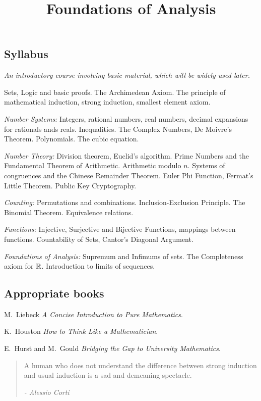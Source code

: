 \documentclass[10pt]{scrartcl}
\title{Foundations of Analysis}
\begin{document}
{
\subsection*{Syllabus}
\textit{An introductory course involving basic material, which will be widely used later.}

Sets, Logic and basic proofs. The Archimedean Axiom. The principle of mathematical induction, strong induction, smallest element axiom. 

\emph{Number Systems:} Integers, rational numbers, real numbers, decimal expansions for rationals ands
reals. Inequalities. The Complex Numbers, De Moivre's Theorem. Polynomials. The cubic equation.

\emph{Number Theory:} Division theorem, Euclid’s algorithm. Prime Numbers and the Fundamental Theorem of Arithmetic. Arithmetic modulo $n$. Systems of congruences and the Chinese Remainder Theorem. Euler Phi Function, Fermat's Little Theorem. Public Key Cryptography.

\emph{Counting:} Permutations and combinations. Inclusion-Exclusion Principle. The Binomial Theorem. Equivalence relations.  

\emph{Functions:} Injective, Surjective and Bijective Functions, mappings between functions. Countability of Sets, Cantor's Diagonal Argument. 

\emph{Foundations of Analysis:} Supremum and Infimums of sets. The Completeness axiom for $\mathbb{R}$.  Introduction to limits of sequences.

\subsection*{Appropriate books}

{\shortskip
M.~Liebeck \emph{A Concise Introduction to Pure Mathematics}.

K.~Houston \emph{How to Think Like a Mathematician}. 

E.~Hurst and M.~Gould \emph{Bridging the Gap to University Mathematics}. 
}}

\TableofContents



\setcounter{page}{3}

\begin{quote}
 A human who does not understand the difference between strong induction and usual induction is a sad and demeaning spectacle. 
\begin{flushright}
      \textit{ -  Alessio Corti}
       \end{flushright} 
\end{quote} 
\end{document}
